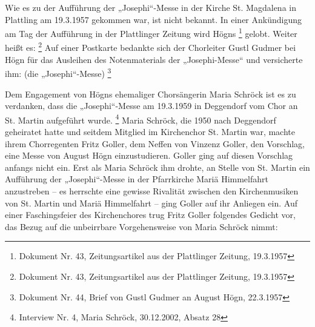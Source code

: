Wie es zu der Aufführung der „Josephi“-Messe in der Kirche St. Magdalena
in Plattling am 19.3.1957 gekommen war, ist nicht bekannt. In einer
Ankündigung am Tag der Aufführung in der Plattlinger Zeitung wird Högns
 \footnote{Dokument Nr. 43, Zeitungsartikel aus der Plattlinger
Zeitung, 19.3.1957} gelobt. Weiter heißt es:  \footnote{Dokument Nr. 43, Zeitungsartikel aus der
Plattlinger Zeitung, 19.3.1957} Auf einer Postkarte bedankte sich der
Chorleiter Gustl Gudmer bei Högn für das Ausleihen des Notenmaterials
der „Josephi-Messe“ und versicherte ihm: (die
„Josephi“-Messe) \footnote{Dokument Nr.
44, Brief von Gustl Gudmer an August Högn, 22.3.1957}

Dem Engagement von Högns ehemaliger Chorsängerin Maria Schröck ist es zu
verdanken, dass die „Josephi“-Messe am 19.3.1959 in Deggendorf vom Chor
an St. Martin aufgeführt wurde. \footnote{Interview Nr. 4, Maria
Schröck, 30.12.2002, Absatz 28} Maria Schröck, die 1950 nach Deggendorf
geheiratet hatte und seitdem Mitglied im Kirchenchor St. Martin war,
machte ihrem Chorregenten Fritz Goller, dem Neffen von Vinzenz Goller,
den Vorschlag, eine Messe von August Högn einzustudieren. Goller ging
auf diesen Vorschlag anfangs nicht ein. Erst als Maria Schröck ihm
drohte, an Stelle von St. Martin ein Aufführung der „Josephi“-Messe in
der Pfarrkirche Mariä Himmelfahrt anzustreben – es herrschte eine
gewisse Rivalität zwischen den Kirchenmusiken von St. Martin und Mariä
Himmelfahrt – ging Goller auf ihr Anliegen ein. Auf einer
Faschingsfeier des Kirchenchores trug Fritz Goller folgendes Gedicht
vor, das Bezug auf die unbeirrbare Vorgehensweise von Maria Schröck
nimmt:



